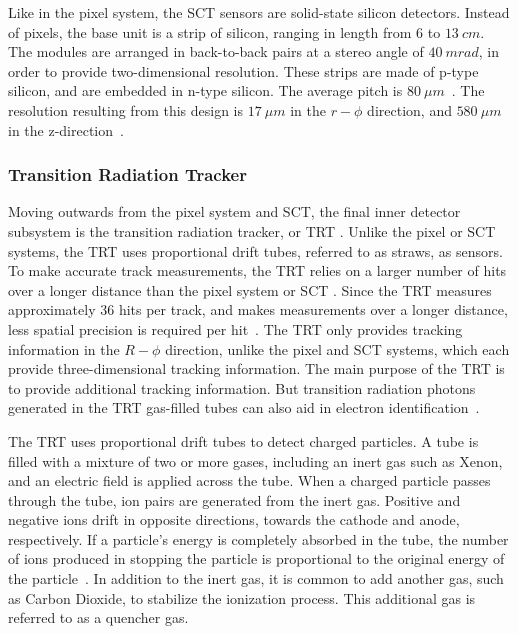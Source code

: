 Like in the pixel system, the SCT sensors are solid-state silicon detectors.
Instead of pixels, the base unit is a strip of silicon, ranging in length from $6$ to $13~cm$.
The modules are arranged in back-to-back pairs at a stereo angle of $40~mrad$, in order to provide two-dimensional resolution.
These strips are made of p-type silicon, and are embedded in n-type silicon.
The average pitch is $80~\mu m$~\cite{sct-2010}.
The resolution resulting from this design is $17~\mu m$ in the $r-\phi$ direction, and $580~\mu m$ in the z-direction~\cite{sct-2010}.

\subsubsection{Transition Radiation Tracker}\label{subsubsec:trt}
Moving outwards from the pixel system and SCT, the final inner detector subsystem is the transition radiation tracker, or TRT .
Unlike the pixel or SCT systems, the TRT uses proportional drift tubes, referred to as straws, as sensors.
To make accurate track measurements, the TRT relies on a larger number of hits over a longer distance than the pixel system or SCT .
Since the TRT measures approximately 36 hits per track, and makes measurements over a longer distance, less spatial precision is required per hit~\cite{atlas-detector-2008}.
The TRT only provides tracking information in the $R-\phi$ direction, unlike the pixel and SCT systems, which each provide three-dimensional tracking information.
The main purpose of the TRT is to provide additional tracking information.
But transition radiation photons generated in the TRT gas-filled tubes can also aid in electron identification~\cite{atlas-detector-2008}.

The TRT uses proportional drift tubes to detect charged particles.
A tube is filled with a mixture of two or more gases, including an inert gas such as Xenon, and an electric field is applied across the tube.
When a charged particle passes through the tube, ion pairs are generated from the inert gas.
Positive and negative ions drift in opposite directions, towards the cathode and anode, respectively.
If a particle's energy is completely absorbed in the tube, the number of ions produced in stopping the particle is proportional to the original energy of the particle~\cite{knoll-2000}.
In addition to the inert gas, it is common to add another gas, such as Carbon Dioxide, to stabilize the ionization process.
This additional gas is referred to as a quencher gas.

